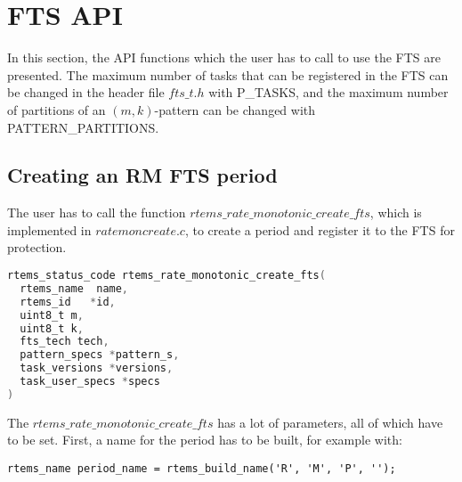 \section{FTS API}
In this section, the API functions which the user has to call to use the FTS are presented. The maximum number of tasks that can be registered in the FTS can be changed in the header file $fts\_t.h$ with \mbox{P\_TASKS}, and the maximum number of partitions of an $(m,k)$-pattern can be changed with \mbox{PATTERN\_PARTITIONS}.
\subsection{Creating an RM FTS period}
The user has to call the function $rtems\_rate\_monotonic\_create\_fts$, which is implemented in $ratemoncreate.c$, to create a period and register it to the FTS for protection. 
\begin{lstlisting}[language=C]
rtems_status_code rtems_rate_monotonic_create_fts(
  rtems_name  name,
  rtems_id   *id,
  uint8_t m,
  uint8_t k,
  fts_tech tech,
  pattern_specs *pattern_s,
  task_versions *versions,
  task_user_specs *specs
)
\end{lstlisting}
The $rtems\_rate\_monotonic\_create\_fts$ has a lot of parameters, all of which have to be set. First, a name for the period has to be built, for example with: \begin{verbatim}
rtems_name period_name = rtems_build_name('R', 'M', 'P', '');
\end{verbatim}

